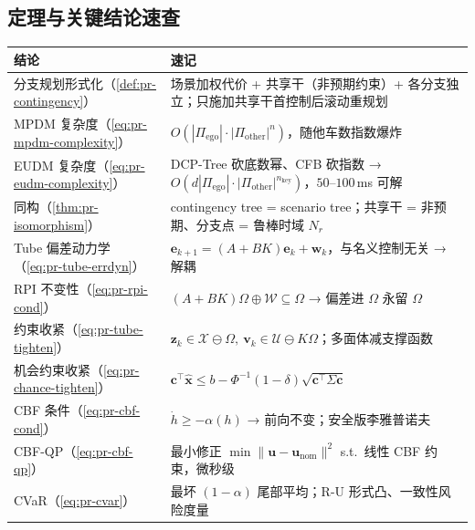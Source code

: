 \subsection*{定理与关键结论速查}
\begin{table}[H]\centering\small
\begin{tabular}{p{}p{}}
\toprule
结论 & 速记 \\
\midrule
分支规划形式化（\cref{def:pr-contingency}） & 场景加权代价 + 共享干（非预期约束）+ 各分支独立；只施加共享干首控制后滚动重规划 \\
MPDM 复杂度（\cref{eq:pr-mpdm-complexity}） & $O(|\Pi_{\mathrm{ego}}|\cdot|\Pi_{\mathrm{other}}|^n)$，随他车数指数爆炸 \\
EUDM 复杂度（\cref{eq:pr-eudm-complexity}） & DCP-Tree 砍底数幂、CFB 砍指数 → $O(d|\Pi_{\mathrm{ego}}|\cdot|\Pi_{\mathrm{other}}|^{n_{\mathrm{key}}})$，$50$--$100\,$ms 可解 \\
同构（\cref{thm:pr-isomorphism}） & contingency tree = scenario tree；共享干 = 非预期、分支点 = 鲁棒时域 $N_r$ \\
Tube 偏差动力学（\cref{eq:pr-tube-errdyn}） & $\mathbf{e}_{k+1}=(A+BK)\mathbf{e}_k+\mathbf{w}_k$，与名义控制无关 → 解耦 \\
RPI 不变性（\cref{eq:pr-rpi-cond}） & $(A+BK)\Omega\oplus\mathcal{W}\subseteq\Omega$ → 偏差进 $\Omega$ 永留 $\Omega$ \\
约束收紧（\cref{eq:pr-tube-tighten}） & $\mathbf{z}_k\in\mathcal{X}\ominus\Omega,\ \mathbf{v}_k\in\mathcal{U}\ominus K\Omega$；多面体减支撑函数 \\
机会约束收紧（\cref{eq:pr-chance-tighten}） & $\mathbf{c}^\top\hat{\mathbf{x}}\le b-\Phi^{-1}(1-\delta)\sqrt{\mathbf{c}^\top\Sigma\mathbf{c}}$ \\
CBF 条件（\cref{eq:pr-cbf-cond}） & $\dot h\ge-\alpha(h)$ → 前向不变；安全版李雅普诺夫 \\
CBF-QP（\cref{eq:pr-cbf-qp}） & 最小修正 $\min\|\mathbf{u}-\mathbf{u}_{\mathrm{nom}}\|^2$ s.t.\ 线性 CBF 约束，微秒级 \\
CVaR（\cref{eq:pr-cvar}） & 最坏 $(1-\alpha)$ 尾部平均；R-U 形式凸、一致性风险度量 \\
\bottomrule
\end{tabular}
\end{table}

